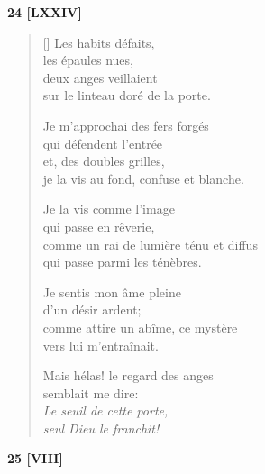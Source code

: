 \documentclass[a4paper,12pt]{book}
\begin{document}
\bigskip

\begin{center}
  \textbf{24 [LXXIV]}
\end{center}

\settowidth{\versewidth}{je la vis au fond, confuse et blanche.}

\begin{verse}[\versewidth]
  Les habits défaits, \\
  les épaules nues, \\
  deux anges veillaient \\
  sur le linteau doré de la porte.

  Je m'approchai des fers forgés \\
  qui défendent l'entrée \\
  et, des doubles grilles, \\
  je la vis au fond, confuse et blanche.

  Je la vis comme l'image \\
  qui passe en rêverie, \\
  comme un rai de lumière ténu et diffus \\
  qui passe parmi les ténèbres.

  Je sentis mon âme pleine \\
  d'un désir ardent; \\
  comme attire un abîme, ce mystère \\
  vers lui m'entraînait.

  Mais hélas! le regard des anges \\
  semblait me dire: \\
  \emph{Le seuil de cette porte, \\
  seul Dieu le franchit!}
\end{verse}

\bigskip

\begin{center}
  \textbf{25 [VIII]}
\end{center}

\settowidth{\versewidth}{et m'inonder de leur lumière, et avec elles}
\end{document}
